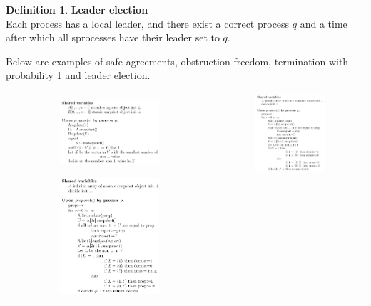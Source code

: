 \documentclass{article}
\theoremstyle{definition}
\newtheorem{definition}{Definition}[section]
\begin{document}
\begin{definition}\textbf{Leader election}\\
Each process has a local leader, and there exist a correct process $q$ and a time after which all sprocesses have their leader set to $q$.
\end{definition}

Below are examples of safe agreements, obstruction freedom, termination with probability 1 and leader election.

\begin{center}
\begin{tabular}{c c}
\includegraphics[width=0.5\textwidth]{safe_agree_ex} &
\includegraphics[width=0.5\textwidth]{obstruct_agree_ex} \\
\includegraphics[width=0.5\textwidth]{prob_agree_ex} &

\end{tabular}
\end{center}
\end{document}
